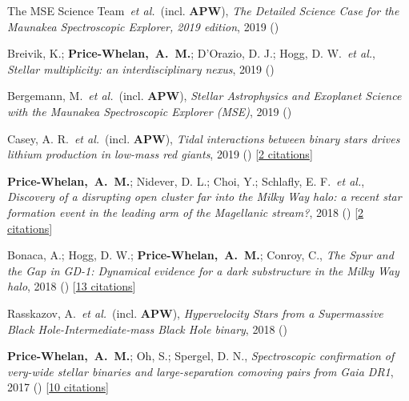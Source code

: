\item[{\color{deemph}\scriptsize8}]The MSE Science Team~\textit{et al.}~(incl. \textbf{APW}), \textit{The Detailed Science Case for the Maunakea Spectroscopic Explorer, 2019 edition}, 2019 ()

\item[{\color{deemph}\scriptsize7}]Breivik, K.; \textbf{Price-Whelan,~A.~M.}; D'Orazio, D. J.; Hogg, D. W.~\textit{et al.}, \textit{Stellar multiplicity: an interdisciplinary nexus}, 2019 ()

\item[{\color{deemph}\scriptsize6}]Bergemann, M.~\textit{et al.}~(incl. \textbf{APW}), \textit{Stellar Astrophysics and Exoplanet Science with the Maunakea Spectroscopic Explorer (MSE)}, 2019 ()

\item[{\color{deemph}\scriptsize5}]Casey, A. R.~\textit{et al.}~(incl. \textbf{APW}), \textit{Tidal interactions between binary stars drives lithium production in low-mass red giants}, 2019 () [\href{http://adsabs.harvard.edu/abs/2019arXiv190204102C}{2 citations}]

\item[{\color{deemph}\scriptsize4}]\textbf{Price-Whelan,~A.~M.}; Nidever, D. L.; Choi, Y.; Schlafly, E. F.~\textit{et al.}, \textit{Discovery of a disrupting open cluster far into the Milky Way halo: a recent star formation event in the leading arm of the Magellanic stream?}, 2018 () [\href{http://adsabs.harvard.edu/abs/2018arXiv181105991P}{2 citations}]

\item[{\color{deemph}\scriptsize3}]Bonaca, A.; Hogg, D. W.; \textbf{Price-Whelan,~A.~M.}; Conroy, C., \textit{The Spur and the Gap in GD-1: Dynamical evidence for a dark substructure in the Milky Way halo}, 2018 () [\href{http://adsabs.harvard.edu/abs/2018arXiv181103631B}{13 citations}]

\item[{\color{deemph}\scriptsize2}]Rasskazov, A.~\textit{et al.}~(incl. \textbf{APW}), \textit{Hypervelocity Stars from a Supermassive Black Hole-Intermediate-mass Black Hole binary}, 2018 ()

\item[{\color{deemph}\scriptsize1}]\textbf{Price-Whelan,~A.~M.}; Oh, S.; Spergel, D. N., \textit{Spectroscopic confirmation of very-wide stellar binaries and large-separation comoving pairs from Gaia DR1}, 2017 () [\href{http://adsabs.harvard.edu/abs/2017arXiv170903532P}{10 citations}]